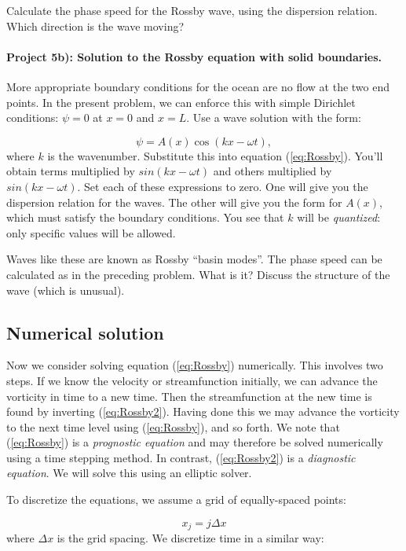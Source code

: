 \documentclass[%
oneside,                 %
final,                   %
10pt]{article}
\begin{document}
Calculate the phase speed for the Rossby wave, using the dispersion relation. Which direction is the wave moving?


\paragraph{Project 5b): Solution to the Rossby equation with solid boundaries.}
More appropriate boundary conditions for the ocean are no flow at the
two end points. In the present problem, we can enforce this with
simple Dirichlet conditions: $\psi=0$ at $x=0$ and $x=L$. Use
a wave solution with the form:

\begin{equation}
	\psi = A(x)\cos(kx - \omega t), 
\end{equation}
where $k$ is the wavenumber. Substitute this into equation
(\ref{eq:Rossby}). You'll obtain terms multiplied by $sin(kx - \omega
t)$ and others multiplied by $sin(kx - \omega t)$. Set each of these
expressions to zero. One will give you the dispersion relation for the
waves. The other will give you the form for $A(x)$, which must satisfy
the boundary conditions. You see that $k$ will be \emph{quantized}:
only specific values will be allowed.

Waves like these are known as Rossby ``basin modes''. The phase speed
can be calculated as in the preceding problem. What is it? Discuss the
structure of the wave (which is unusual).


\subsection{Numerical solution}
Now we consider solving equation (\ref{eq:Rossby}) numerically. This
involves two steps. If we know the velocity or streamfunction
initially, we can advance the vorticity in time to a new time. Then
the streamfunction at the new time is found by inverting
(\ref{eq:Rossby2}). Having done this we may advance the vorticity to
the next time level using (\ref{eq:Rossby}), and so forth. We note
that (\ref{eq:Rossby}) is a \emph{prognostic equation} and may
therefore be solved numerically using a time stepping method. In
contrast, (\ref{eq:Rossby2}) is a \emph{diagnostic equation}. We will
solve this using an elliptic solver.

To discretize the equations, we assume a grid of equally-spaced
points:

\begin{equation}
x_j = j\Delta x
\end{equation}
where $\Delta x$ is the grid spacing. We discretize time in a similar way:
\end{document}
